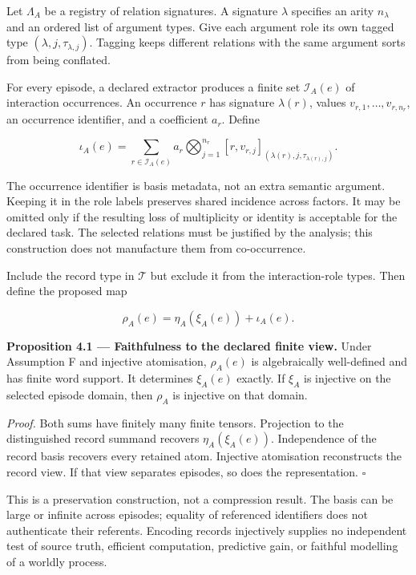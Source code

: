\documentclass[11pt,a4paper]{article}
\begin{document}
Let \(\Lambda_A\) be a registry of relation signatures. A signature
\(\lambda\) specifies an arity \(n_\lambda\) and an ordered list of
argument types. Give each argument role its own tagged type
\((\lambda,j,\tau_{\lambda,j})\). Tagging keeps different relations with
the same argument sorts from being conflated.

For every episode, a declared extractor produces a finite set
\(\mathscr I_A(e)\) of interaction occurrences. An occurrence \(r\) has
signature \(\lambda(r)\), values \(v_{r,1},\ldots,v_{r,n_r}\), an
occurrence identifier, and a coefficient \(a_r\). Define

\nopagebreak[4]

\[
\iota_A(e)=\sum_{r\in\mathscr I_A(e)}a_r
\bigotimes_{j=1}^{n_r}[r,v_{r,j}]_{(\lambda(r),j,\tau_{\lambda(r),j})}.
\]

The occurrence identifier is basis metadata, not an extra semantic
argument. Keeping it in the role labels preserves shared incidence
across factors. It may be omitted only if the resulting loss of
multiplicity or identity is acceptable for the declared task. The
selected relations must be justified by the analysis; this construction
does not manufacture them from co-occurrence.

Include the record type in \(\mathcal T\) but exclude it from the
interaction-role types. Then define the proposed map

\nopagebreak[4]

\[
\boxed{\rho_A(e)=\eta_A(\xi_A(e))+\iota_A(e).}
\]


\textbf{Proposition 4.1 --- Faithfulness to the declared finite view.}
Under Assumption F and injective atomisation, \(\rho_A(e)\) is
algebraically well-defined and has finite word support. It determines
\(\xi_A(e)\) exactly. If \(\xi_A\) is injective on the selected episode
domain, then \(\rho_A\) is injective on that domain.

\emph{Proof.} Both sums have finitely many finite tensors. Projection to
the distinguished record summand recovers \(\eta_A(\xi_A(e))\).
Independence of the record basis recovers every retained atom. Injective
atomisation reconstructs the record view. If that view separates
episodes, so does the representation. \(\square\)

This is a preservation construction, not a compression result. The basis
can be large or infinite across episodes; equality of referenced
identifiers does not authenticate their referents. Encoding records
injectively supplies no independent test of source truth, efficient
computation, predictive gain, or faithful modelling of a worldly
process.
\end{document}
